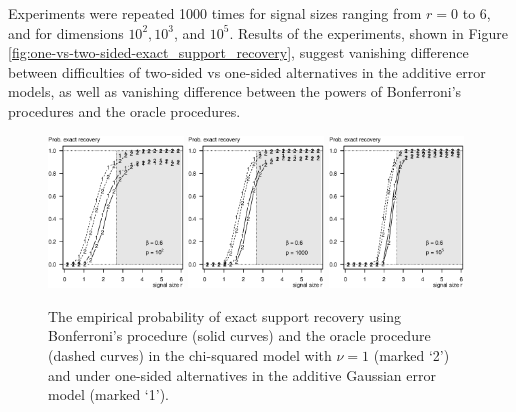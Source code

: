 Experiments were repeated 1000 times for signal sizes ranging from $r=0$ to $6$, and for dimensions $10^2, 10^3$, and $10^5$.
Results of the experiments, shown in Figure \ref{fig:one-vs-two-sided-exact_support_recovery}, suggest vanishing difference between difficulties of two-sided vs one-sided alternatives in the additive error models, as well as vanishing difference between the powers of Bonferroni's procedures and the oracle procedures.

\begin{figure}
      \centering
      \includegraphics[width=0.32\textwidth]{./sim_one-vs-two-sided/exact_recovery_one-vs-two-sided_beta06_p100.eps}
      \includegraphics[width=0.32\textwidth]{./sim_one-vs-two-sided/exact_recovery_one-vs-two-sided_beta06_p1000.eps}
      \includegraphics[width=0.32\textwidth]{./sim_one-vs-two-sided/exact_recovery_one-vs-two-sided_beta06_p100000.eps}
      \caption{The empirical probability of exact support recovery using Bonferroni's procedure (solid curves) and the oracle procedure (dashed curves) in the chi-squared model with $\nu=1$ (marked `2') and under one-sided alternatives in the additive Gaussian error model (marked `1'). 
}
\end{figure}
